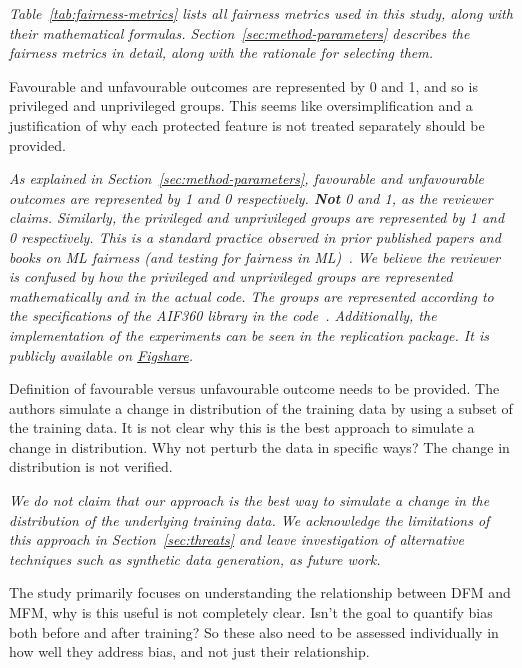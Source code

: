 \documentclass[conference,review,anonymous]{IEEEtran}
\newcommand{\highlight}[1]{\begin{framed}%
  \noindent\emph{#1}
\end{framed}}
\begin{document}
\highlight{Table~\ref{tab:fairness-metrics} lists all fairness metrics
used in this study, along with their mathematical
formulas. Section~\ref{sec:method-parameters} describes the fairness
metrics in detail, along with the rationale for selecting them.}

Favourable and unfavourable outcomes are represented by
0 and 1, and so is privileged and unprivileged groups. This seems like
oversimplification and a justification of why each protected feature
is not treated separately should be provided.

\highlight{As explained in Section~\ref{sec:method-parameters},
favourable and unfavourable outcomes are represented by 1 and
0 respectively. \textbf{Not} 0 and 1, as the reviewer
claims. Similarly, the privileged and unprivileged groups are
represented by 1 and 0 respectively. This is a standard practice
observed in prior published papers and books on ML fairness (and
testing for fairness in
ML)~\cite{barocas2019fairness,zhang2021ignorance,biswas2021fair}. We
believe the reviewer is confused by how the privileged and
unprivileged groups are represented mathematically and in the actual
code. The groups are represented according to the specifications of
the \emph{AIF360} library in the
code~\cite{bellamy2019ai}. Additionally, the implementation of the
experiments can be seen in the replication package. It is publicly
available on
\href{https://figshare.com/s/67206f7c219b12885a6f}{Figshare}.}

Definition of favourable versus unfavourable outcome needs to be
provided. The authors simulate a change in distribution of the
training data by using a subset of the training data. It is not clear
why this is the best approach to simulate a change in
distribution. Why not perturb the data in specific ways? The change in
distribution is not verified.

\highlight{We do not claim that our approach is the best way to
simulate a change in the distribution of the underlying training
data. We acknowledge the limitations of this approach in
Section~\ref{sec:threats} and leave investigation of alternative
techniques such as synthetic data generation, as future work.}

The study primarily focuses on understanding the relationship between
DFM and MFM, why is this useful is not completely clear. Isn't the
goal to quantify bias both before and after training? So these also
need to be assessed individually in how well they address bias, and
not just their relationship. 
\end{document}
